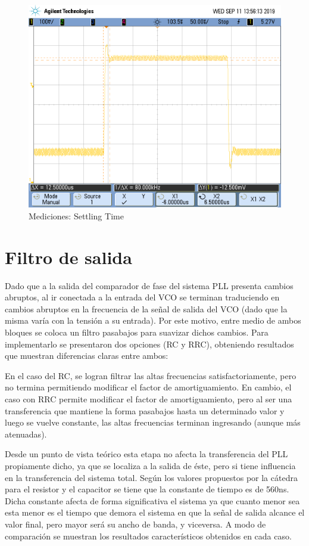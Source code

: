 \documentclass{article}
\begin{document}
\begin{figure}[H]
\centering
\includegraphics[width=0.8\linewidth]{images/05vpp/settling_time.PNG}
\caption{Mediciones: Settling Time}
\label{fig:settling_time}
\end{figure}


\section*{Filtro de salida}
Dado que a la salida del comparador de fase del sistema PLL presenta cambios abruptos, al ir conectada a la entrada del VCO se terminan traduciendo en cambios abruptos en la frecuencia de la señal de salida del VCO (dado que la misma varía con la tensión a su entrada). Por este motivo, entre medio de ambos bloques se coloca un filtro pasabajos para suavizar dichos cambios. Para implementarlo se presentaron dos opciones (RC y RRC), obteniendo resultados que muestran diferencias claras entre ambos:\par
En el caso del RC, se logran filtrar las altas frecuencias satisfactoriamente, pero no termina permitiendo modificar el factor de amortiguamiento. En cambio, el caso con RRC permite modificar el factor de amortiguamiento, pero al ser una transferencia que mantiene la forma pasabajos hasta un determinado valor y luego se vuelve constante, las altas frecuencias terminan ingresando (aunque más atenuadas).

Desde un punto de vista teórico esta etapa no afecta la transferencia del PLL propiamente dicho, ya que se localiza a la salida de éste, pero si tiene influencia en la transferencia del sistema total. Según los valores propuestos por la cátedra para el resistor y el capacitor se tiene que la constante de tiempo es de 560ns. Dicha constante afecta de forma significativa el sistema ya que cuanto menor sea esta menor es el tiempo que demora el sistema en que la señal de salida alcance el valor final, pero mayor será su ancho de banda, y viceversa.
A modo de comparación se muestran los resultados característicos obtenidos en cada caso.
\end{document}
